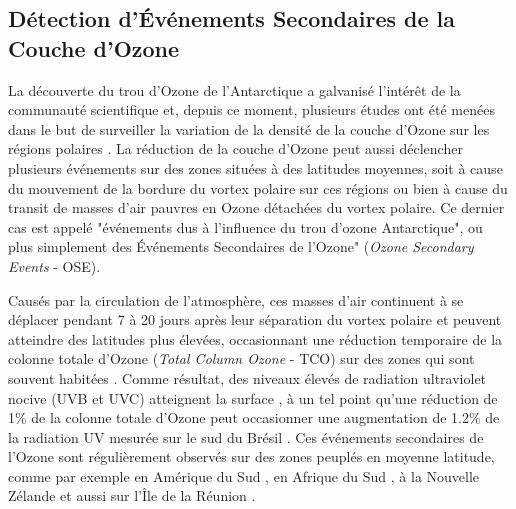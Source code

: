 \subsection{Détection d'Événements Secondaires de la Couche d'Ozone\label{subsec:ozone}}

La découverte du trou d'Ozone de l'Antarctique \cite{Farman1985} a galvanisé l'intérêt de la communauté scientifique et, depuis ce moment, plusieurs études ont été menées dans le but de surveiller la variation de la densité de la couche d'Ozone sur les régions polaires \cite{Solomon1999}\cite{Salby2012}. La réduction de la couche d'Ozone peut aussi déclencher plusieurs événements sur des zones situées à des latitudes moyennes, soit à cause du mouvement de la bordure du vortex polaire sur ces régions  \cite{Kirchhoff1997}\cite{Marchand2005} ou bien à cause du transit de masses d'air pauvres en Ozone détachées du vortex polaire. Ce dernier cas est appelé "événements dus à l'influence du trou d'ozone Antarctique", ou plus simplement des Événements Secondaires de l'Ozone" (\textit{Ozone Secondary Events}  - OSE). 

Causés par la circulation de l'atmosphère, ces masses d'air continuent à se déplacer pendant 7 à 20 jours après leur séparation du vortex polaire et peuvent atteindre des latitudes plus élevées, occasionnant une réduction temporaire de la colonne totale d'Ozone (\textit{Total Column Ozone} - TCO) sur des zones qui sont souvent habitées \cite{Prather1990}\cite{Waugh1994}\cite{Manney1994}. Comme résultat, des niveaux élevés de radiation ultraviolet nocive (UVB et UVC) atteignent la surface \cite{Casiccia2008}, à un tel point qu'une réduction de 1\% de la colonne totale d'Ozone peut occasionner une augmentation de 1.2\% de la radiation UV mesurée sur le sud du Brésil \cite{Guarnieri2004}. Ces événements secondaires de l'Ozone sont régulièrement observés sur des zones peuplés en moyenne latitude, comme par exemple en Amérique du Sud \cite{Kirschhoff1996}\cite{Pinheiro2011}, en Afrique du Sud \cite{Semane2006}\cite{Sivakumar2007}, à la Nouvelle Zélande \cite{Brinksma1998} et aussi sur l'Île de la Réunion \cite{toihir2015}. 


